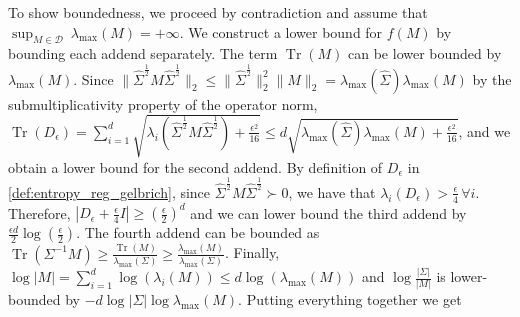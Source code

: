 \documentclass[letterpaper, 10 pt, conference]{ieeeconf}  %
\makeatletter
\renewenvironment{proof}[1][\proofname]{\par
  \pushQED{\qed}%
  \normalfont \topsep\z@
  \trivlist
  \item[\hskip2em
        \itshape
    #1\@addpunct{:}]\ignorespaces
}{%
  \popQED\endtrivlist\@endpefalse
}
\theoremstyle{ieeeconf}
\DeclareMathOperator{\Tr}{Tr}
\makeatother
\begin{document}
\begin{proof}
    To show boundedness, we proceed by contradiction and assume that $\sup_{M\in\mathcal{D}}\ \lambda_{\max}(M) = +\infty$. We construct a lower bound for $f(M)$ by bounding each addend separately.
    The term $\Tr(M)$ can be lower bounded by $\lambda_{\max}(M)$. Since $\|\hat{\Sigma}^{\frac{1}{2}}M\hat{\Sigma}^{\frac{1}{2}}\|_2 \leq \|\hat{\Sigma}^{\frac{1}{2}}\|_2^2\|M\|_2 = 
    \lambda_{\max}(\hat{\Sigma})\lambda_{\max}(M)$ by the submultiplicativity property of the operator norm, $\Tr(D_\epsilon) = \sum_{i=1}^d \sqrt{\lambda_i(\hat{\Sigma}^\frac{1}{2}M\hat{\Sigma}^\frac{1}{2}) + \frac{\epsilon^2}{16}}
    \leq d\sqrt{\lambda_{\max}(\hat{\Sigma})\lambda_{\max}(M) + \frac{\epsilon^2}{16}}$, and we obtain a lower bound for the second addend. By definition of $D_\epsilon$ in \cref{def:entropy_reg_gelbrich}, since $\hat{\Sigma}^\frac{1}{2}M\hat{\Sigma}^\frac{1}{2} \succ 0$, we have that $\lambda_i(D_\epsilon) > \frac{\epsilon}{4}\, \forall i$. Therefore, $\left|D_\epsilon + \frac{\epsilon}{4}I\right| \geq \left(\frac{\epsilon}{2}\right)^d$ and we can lower bound the third addend by $\frac{\epsilon d}{2}\log\left(\frac{\epsilon}{2}\right)$. The fourth addend can be bounded as
    $\Tr(\Sigma^{-1}M) \geq \frac{\Tr(M)}{\lambda_{\max}(\Sigma)} \geq \frac{\lambda_{\max}(M)}{\lambda_{\max}(\Sigma)}$. Finally, $\log|M| = \sum_{i=1}^d \log(\lambda_i(M)) \leq d\log(\lambda_{\max}(M))$ and $\log\frac{|\Sigma|}{|M|}$ is lower-bounded by $-d\log|\Sigma|\log\lambda_{\max}(M)$. Putting
    everything together we get

\end{proof}
\end{document}
